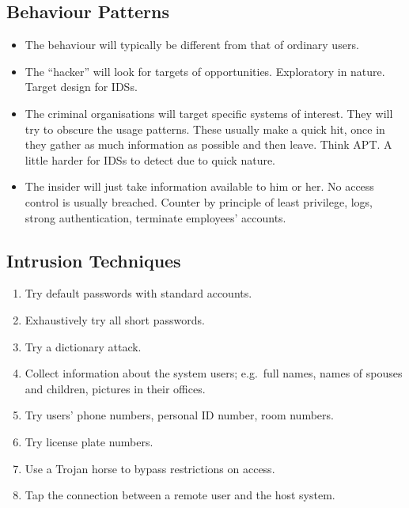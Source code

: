 \documentclass{beamer}
\begin{document}
\subsection{Behaviour Patterns}

\begin{frame}{\insertsubsectionhead}
  \begin{itemize}
    \item The behaviour will typically be different from that of ordinary 
      users.

    \item The ``hacker'' will look for targets of opportunities.
      Exploratory in nature.
      Target design for IDSs.

    \item The criminal organisations will target specific systems of interest.
      They will try to obscure the usage patterns.
      These usually make a quick hit, once in they gather as much information 
      as possible and then leave.
      Think APT.
      A little harder for IDSs to detect due to quick nature.

    \item The insider will just take information available to him or her.
      No access control is usually breached.
      Counter by principle of least privilege, logs, strong authentication, 
      terminate employees' accounts.

  \end{itemize}
\end{frame}

\subsection{Intrusion Techniques}

\begin{frame}{\insertsubsectionhead}
  \begin{enumerate}
    \item Try default passwords with standard accounts.
    \item Exhaustively try all short passwords.
    \item Try a dictionary attack.
    \item Collect information about the system users; e.g.\ full names, names 
      of spouses and children, pictures in their offices.
    \item Try users' phone numbers, personal ID number, room numbers.
    \item Try license plate numbers.
    \item Use a Trojan horse to bypass restrictions on access.
    \item Tap the connection between a remote user and the host system.
  \end{enumerate}
\end{frame}
\end{document}
